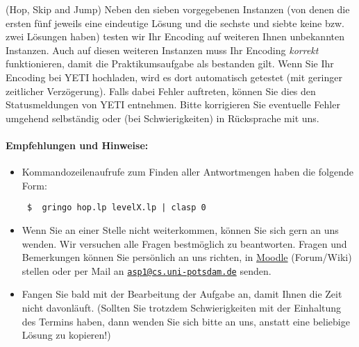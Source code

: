 \documentclass[a4paper,12pt,ngerman]{article}
\begin{document}
\begin{PraktikumsAufgabe}{1}{(Hop, Skip and Jump)}
\noindent
Neben den sieben vorgegebenen Instanzen (von denen die ersten fünf jeweils eine eindeutige L\"osung
und die sechste und siebte keine bzw. zwei Lösungen haben)
testen wir Ihr Encoding auf weiteren Ihnen unbekannten Instanzen.
Auch auf diesen weiteren Instanzen muss Ihr Encoding \emph{korrekt} funktionieren,
damit die Praktikumsaufgabe als bestanden gilt.
Wenn Sie Ihr Encoding bei YETI hochladen, wird es dort automatisch getestet
(mit geringer zeitlicher Verz\"ogerung).
Falls dabei Fehler auftreten, k\"onnen Sie dies %
den Statusmeldungen von YETI entnehmen.
Bitte korrigieren Sie eventuelle Fehler umgehend selbständig oder
(bei Schwierigkeiten) in Rücksprache mit uns.


\paragraph{Empfehlungen und Hinweise:}
\begin{itemize}
\item Kommandozeilenaufrufe zum Finden aller Antwortmengen haben die folgende Form:%
\vspace{-1.5mm}%
\begin{verbatim}
 $  gringo hop.lp levelX.lp | clasp 0
\end{verbatim}
\vspace{-1mm}
%
\item Wenn Sie an einer Stelle nicht weiterkommen, können Sie sich gern an uns wenden.
      Wir versuchen alle Fragen bestmöglich zu beantworten.
      Fragen und Bemerkungen k\"onnen Sie pers\"onlich an uns richten,
      in \href{http://moodle.cs.uni-potsdam.de/course/view.php?id=39}{Moodle} (Forum/Wiki) stellen oder per Mail an
      \href{mailto:asp1@cs.uni-potsdam.de}{\texttt{asp1@cs.uni-potsdam.de}} senden.
\item Fangen Sie bald mit der Bearbeitung der Aufgabe an, damit Ihnen die Zeit nicht davonläuft.
      (Sollten Sie trotzdem Schwierigkeiten mit der Einhaltung des Termins
       haben, dann wenden Sie sich bitte an uns, anstatt eine beliebige Lösung
       zu kopieren!)
\end{itemize}

\end{PraktikumsAufgabe}
\end{document}
